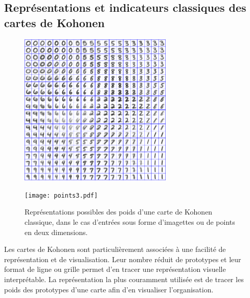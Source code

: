 \documentclass[../main]{subfiles}
\begin{document}
\subsection{Représentations et indicateurs classiques des cartes de Kohonen}
\begin{figure}[t]
    \begin{minipage}{0.5\textwidth}
    \centering
    \includegraphics[width=0.65\textwidth]{digits.jpg}
    \end{minipage}
    \begin{minipage}{0.5\textwidth}
    \centering
    \texttt{[image: points3.pdf]}
    \end{minipage}
    \caption[Représentations classiques des poids d'une carte de Kohonen]{\label{fig:representation} Représentations possibles des poids d'une carte de Kohonen classique, dans le cas d'entrées sous forme d'imagettes \footnotemark[1] ou de points en deux dimensions.}
    \end{figure}
Les cartes de Kohonen sont particulièrement associées à une facilité de représentation et de visualisation. Leur nombre réduit de prototypes et leur format de ligne ou grille permet d'en tracer une représentation visuelle interprétable.
La représentation la plus couramment utilisée est de tracer les poids des prototypes d'une carte afin d'en visualiser l'organisation.
\end{document}
